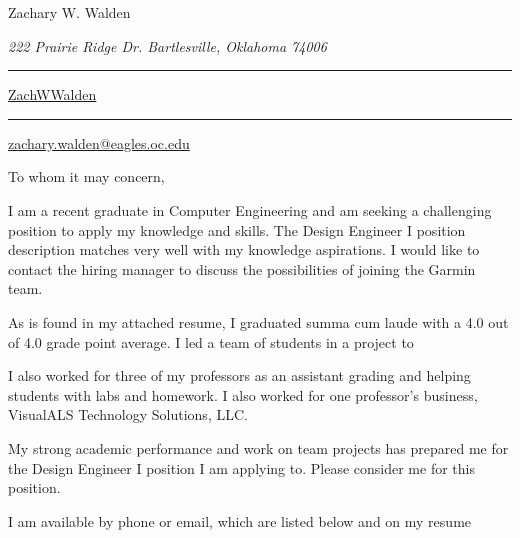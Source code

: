 \documentclass{article}
\newcommand\mybar{\kern1pt\rule[-\dp\strutbox]{.8pt}{\baselineskip}\kern1pt}
\begin{document}
\begin{center}
	\begin{Huge}
		Zachary W. Walden\\
	\end{Huge}
	\begin{large}
		\textsl{222 Prairie Ridge Dr. Bartlesville, Oklahoma 74006}\\
	\end{large}
	\begin{normalsize}
		 \mybar { } \faGithub \href{https://github.com/ZachWWalden}{ ZachWWalden}
		\mybar { }\faEnvelope\href{mailto::zachary.walden@eagles.oc.edu}{ zachary.walden@eagles.oc.edu}
	\end{normalsize}
\end{center}

\begin{adjustwidth}{70pt}{70pt}
\begin{spacing}{1.25}
\vspace*{\fill}
To whom it may concern,

I am a recent graduate in Computer Engineering and am seeking a challenging position to apply my knowledge and skills.  The Design Engineer I position description matches very well with my knowledge aspirations.  I would like to contact the hiring manager to discuss the possibilities of joining the Garmin team.

As is found in my attached resume, I graduated summa cum laude with a 4.0 out of 4.0 grade point average.  I led a team of students in a project to

I also worked for three of my professors as an assistant grading and helping students with labs and homework.  I also worked for one professor’s business, VisualALS Technology Solutions, LLC.

My strong academic performance and work on team projects has prepared me for the Design Engineer I position I am applying to.  Please consider me for this position.

I am available by phone or email, which are listed below and on my resume
\vspace*{\fill}
\end{spacing}
\end{adjustwidth}

\newpage
\end{document}
